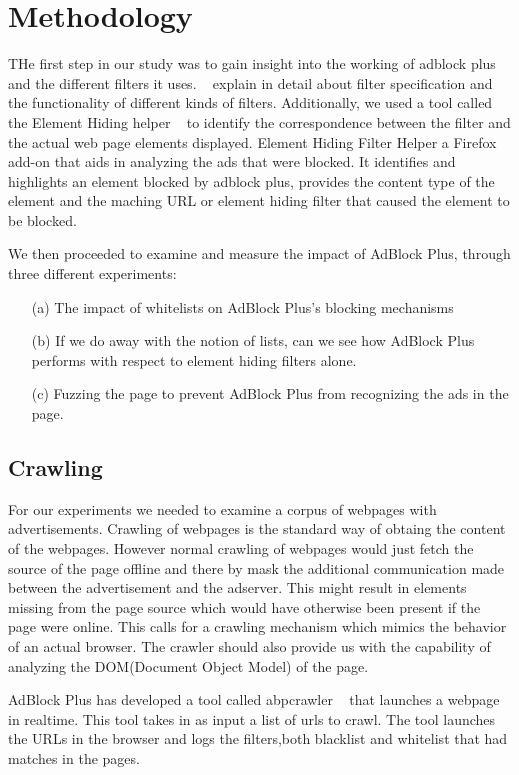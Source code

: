 \section{Methodology}
THe first step in our study was to gain insight into the working of adblock plus and the different filters it uses.
~\cite{walls2015measuring} explain in detail about filter specification and the functionality of different kinds of filters.
Additionally, we used a tool called the Element Hiding helper ~\cite{elemhidehelper}  to identify the correspondence between the filter and the actual web page elements displayed.
Element Hiding Filter Helper a Firefox add-on that aids in analyzing the ads that were blocked.
It identifies and highlights an element blocked by adblock plus, provides the content type of the element and the maching URL or element hiding filter that caused the element to be blocked.

We then proceeded to examine and measure the impact of AdBlock Plus, through three different experiments:
\begin{enumerate}
	\item[(a)] The impact of whitelists on AdBlock Plus's blocking mechanisms
    \item[(b)]If we do away with the notion of lists, can we see how AdBlock Plus performs with respect to element hiding filters alone.
    \item[(c)] Fuzzing the page to prevent AdBlock Plus from recognizing the ads in the page.

\end{enumerate}

\subsection{Crawling}
For our experiments we needed to examine a corpus of webpages with advertisements.
Crawling of webpages is the standard way of obtaing the content of the webpages.
However normal crawling of webpages would just fetch the source of the page offline and there by mask the additional communication made between the  advertisement and the adserver.
This might result in elements  missing from the page source which would have otherwise been present if the page were online.
This calls for a crawling mechanism which mimics the behavior of an actual browser.
The crawler should also provide us with the capability of analyzing the DOM(Document Object Model) of the page.

AdBlock Plus has developed a tool called abpcrawler ~\cite{abpcrawler} that launches a webpage in realtime.
This tool takes in as input a list of urls to crawl. The tool launches the URLs in the browser and logs the filters,both blacklist and whitelist that had matches in the pages.

